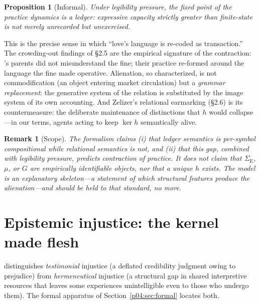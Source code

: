 \documentclass[11pt,a4paper]{article}
\newtheorem{proposition}{Proposition}
\newtheorem{remark}{Remark}
\newcommand{\SE}{\Sigma_{\mathrm{E}}}
\begin{document}
\begin{proposition}[Informal]
Under legibility pressure, the fixed point of the practice dynamics is a
ledger: expressive capacity strictly greater than finite-state is not merely
unrecorded but \emph{unexercised}.
\end{proposition}

This is the precise sense in which ``love's language is re-coded as
transaction.'' The crowding-out findings of \S2.5 are the empirical
signature of the contraction: \citeauthor{gneezy2000}'s parents did not
misunderstand the fine; their practice re-formed around the language the fine
made operative. Alienation, so characterized, is not commodification (an
object entering market circulation) but a \emph{grammar replacement}: the
generative system of the relation is substituted by the image system of its
own accounting. And Zelizer's relational earmarking (\S2.6) is its
countermeasure: the deliberate maintenance of distinctions that $h$ would
collapse---in our terms, agents acting to keep $\ker h$ semantically alive.

\begin{remark}[Scope]
\label{p04:rem:scope}
The formalism claims (i) that ledger semantics is per-symbol compositional
while relational semantics is not, and (ii) that this gap, combined with
legibility pressure, predicts contraction of practice. It does not claim that
$\SE$, $\mu$, or $G$ are empirically identifiable objects, nor that a unique
$h$ exists. The model is an explanatory skeleton---a statement of \emph{which
structural features} produce the alienation---and should be held to that
standard, no more.
\end{remark}

\section{Epistemic injustice: the kernel made flesh}
\label{p04:sec:epistemic}

\textcite{fricker2007} distinguishes \emph{testimonial} injustice (a deflated
credibility judgment owing to prejudice) from \emph{hermeneutical} injustice
(a structural gap in shared interpretive resources that leaves some
experiences unintelligible even to those who undergo them). The formal
apparatus of Section~\ref{p04:sec:formal} locates both.
\end{document}
